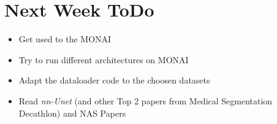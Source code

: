 \documentclass{article}
\begin{document}
  \section{Next Week ToDo }

\begin{itemize}
    \item Get used to the MONAI
    \item Try to run different architectures on MONAI
    \item Adapt the dataloader code to the choosen datasets
    \item Read \textit{nn-Unet} (and other Top 2 papers from Medical Segmentation Decathlon) and NAS Papers
  \end{itemize}
\end{document}
